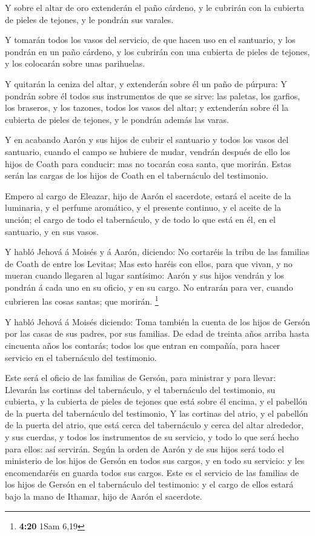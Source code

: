  Y sobre el altar de oro extenderán el paño cárdeno, y le
cubrirán con la cubierta de pieles de tejones, y le pondrán sus varales.

 Y tomarán todos los vasos del servicio, de que hacen uso
en el santuario, y los pondrán en un paño cárdeno, y los cubrirán con
una cubierta de pieles de tejones, y los colocarán sobre unas
parihuelas.

 Y quitarán la ceniza del altar, y extenderán sobre él un
paño de púrpura:  Y pondrán sobre él todos sus
instrumentos de que se sirve: las paletas, los garfios, los braseros, y
los tazones, todos los vasos del altar; y extenderán sobre él la
cubierta de pieles de tejones, y le pondrán además las varas.

 Y en acabando Aarón y sus hijos de cubrir el santuario y
todos los vasos del santuario, cuando el campo se hubiere de mudar,
vendrán después de ello los hijos de Coath para conducir: mas no tocarán
cosa santa, que morirán. Estas serán las cargas de los hijos de Coath en
el tabernáculo del testimonio.

 Empero al cargo de Eleazar, hijo de Aarón el sacerdote,
estará el aceite de la luminaria, y el perfume aromático, y el presente
continuo, y el aceite de la unción; el cargo de todo el tabernáculo, y
de todo lo que está en él, en el santuario, y en sus vasos.

 Y habló Jehová á Moisés y á Aarón, diciendo:
 No cortaréis la tribu de las familias de Coath de entre
los Levitas;  Mas esto haréis con ellos, para que vivan,
y no mueran cuando llegaren al lugar santísimo: Aarón y sus hijos
vendrán y los pondrán á cada uno en su oficio, y en su cargo.
 No entrarán para ver, cuando cubrieren las cosas santas;
que morirán. \footnote{\textbf{4:20} 1Sam 6,19}

 Y habló Jehová á Moisés diciendo:  Toma
también la cuenta de los hijos de Gersón por las casas de sus padres,
por sus familias.  De edad de treinta años arriba hasta
cincuenta años los contarás; todos los que entran en compañía, para
hacer servicio en el tabernáculo del testimonio.

 Este será el oficio de las familias de Gersón, para
ministrar y para llevar:  Llevarán las cortinas del
tabernáculo, y el tabernáculo del testimonio, su cubierta, y la cubierta
de pieles de tejones que está sobre él encima, y el pabellón de la
puerta del tabernáculo del testimonio,  Y las cortinas
del atrio, y el pabellón de la puerta del atrio, que está cerca del
tabernáculo y cerca del altar alrededor, y sus cuerdas, y todos los
instrumentos de su servicio, y todo lo que será hecho para ellos: así
servirán.  Según la orden de Aarón y de sus hijos será
todo el ministerio de los hijos de Gersón en todos sus cargos, y en todo
su servicio: y les encomendaréis en guarda todos sus cargos.
 Este es el servicio de las familias de los hijos de
Gersón en el tabernáculo del testimonio: y el cargo de ellos estará bajo
la mano de Ithamar, hijo de Aarón el sacerdote.

